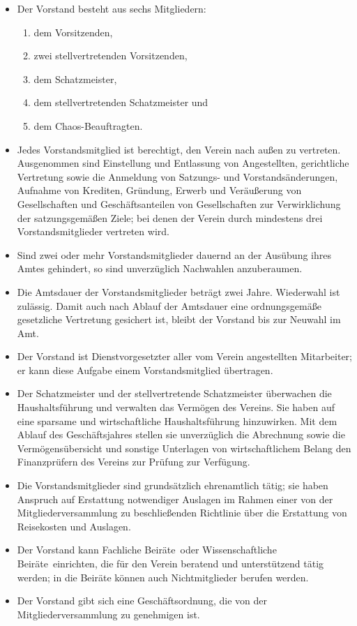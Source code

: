 \documentclass[12pt,paper=a4,ngerman]{scrreprt}
\begin{document}
\begin{itemize}
\item[(1)]
Der Vorstand besteht aus sechs Mitgliedern:
\begin{enumerate}
\item
dem Vorsitzenden,
\item
zwei stellvertretenden Vorsitzenden,
\item
dem Schatzmeister,
\item
dem stellvertretenden Schatzmeister und
\item
dem Chaos-Beauftragten.
\end{enumerate}
\item[(2)]
Jedes Vorstandsmitglied ist berechtigt, den Verein nach außen zu
vertreten. Ausgenommen sind Einstellung und Entlassung von
Angestellten, gerichtliche Vertretung sowie die Anmeldung von Satzungs- und Vorstandsänderungen, Aufnahme von
Krediten, Gründung, Erwerb und Veräußerung von Gesellschaften und
Geschäftsanteilen von Gesellschaften zur Verwirklichung der
satzungsgemäßen Ziele; bei denen der Verein durch mindestens drei
Vorstandsmitglieder vertreten wird.
\item[(3)]
Sind zwei oder mehr Vorstandsmitglieder dauernd an der Ausübung ihres
Amtes gehindert, so sind unverzüglich Nachwahlen anzuberaumen.
\item[(4)]
Die Amtsdauer der Vorstandsmitglieder beträgt zwei Jahre. Wiederwahl
ist zulässig. Damit auch nach Ablauf der Amtsdauer eine ordnungsgemäße
gesetzliche Vertretung gesichert ist, bleibt der Vorstand bis zur
Neuwahl im Amt.
\item[(5)]
Der Vorstand ist Dienstvorgesetzter aller vom Verein angestellten
Mitarbeiter; er kann diese Aufgabe einem Vorstandsmitglied
übertragen.
\item[(6)]
Der Schatzmeister und der stellvertretende Schatzmeister
überwachen die Haushaltsführung und verwalten das Vermögen
des Vereins. Sie haben auf eine sparsame und wirtschaftliche
Haushaltsführung hinzuwirken. Mit dem Ablauf des
Geschäftsjahres stellen sie unverzüglich die Abrechnung sowie die
Vermögensübersicht und sonstige Unterlagen von wirtschaftlichem
Belang den Finanzprüfern des Vereins zur Prüfung zur Verfügung.
\item[(7)]
Die Vorstandsmitglieder sind grundsätzlich ehrenamtlich tätig; sie
haben Anspruch auf Erstattung notwendiger Auslagen im Rahmen einer von
der Mitgliederversammlung zu beschließenden Richtlinie über die
Erstattung von Reisekosten und Auslagen.
\item[(8)]
Der Vorstand kann \glqq Fachliche Beiräte\grqq\ oder \glqq
Wissenschaftliche Beiräte\grqq\ einrichten, die für den Verein
beratend und unterstützend tätig werden; in die Beiräte können auch
Nichtmitglieder berufen werden.
\item[(9)]
Der Vorstand gibt sich eine Geschäftsordnung, die von der
Mitgliederversammlung zu genehmigen ist.
\end{itemize}
\end{document}
